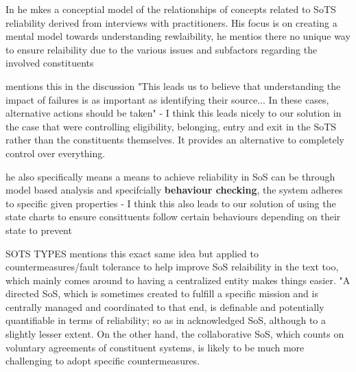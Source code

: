 In \cite{ferreira2023towards} he mkes a conceptial model of the relationships of concepts related to SoTS reliability derived from interviews with practitioners. His focus is on creating a mental model towards understanding rewlaibility, he mentios there no unique way to ensure relaibility due to the various issues and subfactors regarding the involved constituents


\cite{ferreira2023towards} mentions this in the discussion "This leads us to believe that understanding the impact of failures is as important as identifying their source...  In these cases, alternative actions should be taken" - I think this leads nicely to our solution in the case that were controlling eligibility, belonging, entry and exit in the SoTS rather than the constituents themselves. It provides an alternative to completely control over everything. 

\cite{ferreira2021reliability} he also specifically means a means to achieve reliability in SoS can be through model based analysis and specifcially \textbf{behaviour checking}, the system adheres to specific given properties  - I think this also leads to our solution of using the state charts to ensure consittuents follow certain behaviours depending on their state to prevent


SOTS TYPES 
\cite{ferreira2023towards} mentions this exact same idea but applied to countermeasures/fault tolerance to help improve SoS relaibility in the text too, which mainly comes around to having a centralized entity makes things easier. "A directed SoS, which is sometimes created to fulfill a specific mission and is centrally managed and coordinated to that end, is definable and potentially quantifiable in terms of reliability; so as in acknowledged SoS, although to a slightly lesser extent. On the other hand, the collaborative SoS, which counts on voluntary agreements of constituent systems, is likely to be much more challenging to adopt specific countermeasures.
